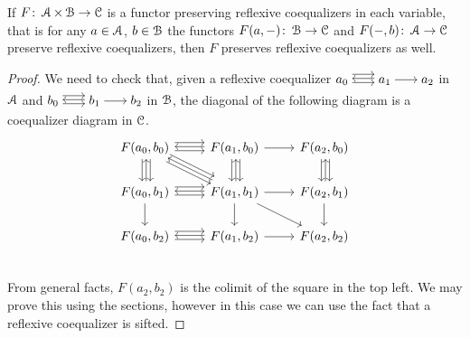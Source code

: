 \documentclass[a4paper,11pt,oneside,openany]{scrbook}
\begin{document}
\begin{prop}
	If $F\colon\operatorname{\mathcal{A}}\times\operatorname{\mathcal{B}}\rightarrow\operatorname{\mathcal{C}}$ is a functor preserving reflexive coequalizers in each variable, that is for any $a\in\operatorname{\mathcal{A}}$, $b\in\operatorname{\mathcal{B}}$ the functors $F(a,-)\colon\operatorname{\mathcal{B}}\rightarrow\operatorname{\mathcal{C}}$ and $F(-,b)\colon\operatorname{\mathcal{A}}\rightarrow\operatorname{\mathcal{C}}$ preserve reflexive coequalizers, then $F$ preserves reflexive coequalizers as well.
\end{prop}

\begin{proof}
	We need to check that, given a reflexive coequalizer $\hspace{-1.5mm}\begin{tikzcd}
	a_0\hspace{-1.5mm}\arrow[r, shift right=.5ex, shorten <= .3em, shorten >= .3em]  \arrow[r, shift left=1ex, shorten <= .3em, shorten >= .3em] & \hspace{-1.5mm}a_1\hspace{-1.5mm}\arrow[l, shift right=.25ex, shorten <=.3em, shorten >=.3em]\arrow[r, shorten <= .3em, shorten >= .3em] & \hspace{-1.5mm}a_2
	\end{tikzcd}\hspace{-1.5mm}$ in $\operatorname{\mathcal{A}}$ and $\hspace{-1.5mm}\begin{tikzcd}
	b_0\hspace{-1.5mm}\arrow[r, shift right=.5ex, shorten <= .3em, shorten >= .3em]  \arrow[r, shift left=1ex, shorten <= .3em, shorten >= .3em] & \hspace{-1.5mm}b_1\hspace{-1.5mm}\arrow[l, shift right=.25ex, shorten <=.3em, shorten >=.3em]\arrow[r, shorten <= .3em, shorten >= .3em] & \hspace{-1.5mm}b_2
	\end{tikzcd}\hspace{-1.5mm}$ in $\operatorname{\mathcal{B}}$, the diagonal of the following diagram is a coequalizer diagram in $\operatorname{\mathcal{C}}$.
	\[
	\begin{tikzcd}
		F(a_0,b_0)\ar[r, shift right=.5ex]\ar[r, shift left=1ex]\ar[d, shift right=.5ex]\ar[d, shift left=1ex]\ar[dr, shift right=.5ex]\ar[dr, shift left=1ex]
		& F(a_1,b_0)\ar[d, shift right=.5ex]\ar[d, shift left=1ex]\ar[l, shift right=.25ex]\ar[r]
		& F(a_2,b_0)\ar[d, shift right=.5ex]\ar[d, shift left=1ex] \\
		F(a_0,b_1)\ar[r, shift right=.5ex]\ar[r, shift left=1ex]\ar[u, shift right=.25ex]\ar[d]
		& F(a_1,b_1)\ar[u, shift right=.25ex]\ar[l, shift right=.25ex]\ar[ul, shift right=.25ex]\ar[r]\ar[d]\ar[dr]
		& F(a_2,b_1)\ar[u, shift right=.25ex]\ar[d] \\
		F(a_0,b_2)\ar[r, shift right=.5ex]\ar[r, shift left=1ex]
		& F(a_1,b_2)\ar[l, shift right=.25ex]\ar[r]
		& F(a_2,b_2) \\
	\end{tikzcd}
	\]
	From general facts, $F(a_2,b_2)$ is the colimit of the square in the top left. We may prove this using the sections, however in this case we can use the fact that a reflexive coequalizer is sifted.
\end{proof}
\end{document}
